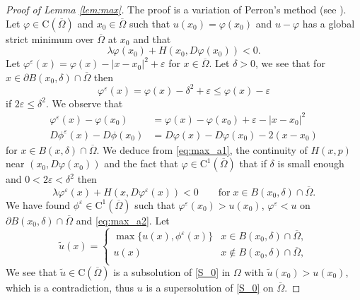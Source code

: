 \documentclass[11pt,reqno]{amsart}
\numberwithin{figure}{section}
\theoremstyle{plain}
\theoremstyle{remark}
\numberwithin{equation}{section}
\newcommand{\rmC}{\mathrm{C}}
\begin{document}
\begin{appendices}
\begin{proof}[Proof of Lemma \ref{lem:max}] The proof is a variation of Perron's method (see \cite{Capuzzo-Dolcetta1990}). Let $\varphi\in \rmC(\overline{\Omega})$ and $x_0\in \overline{\Omega}$ such that $u(x_0) = \varphi(x_0)$ and $u-\varphi$ has a global strict minimum over $\overline{\Omega}$ at $x_0$ and that 
\begin{equation}\label{eq:max_a1}
    \lambda \varphi(x_0) + H(x_0,D\varphi(x_0)) < 0.
\end{equation}
Let $\varphi^\varepsilon(x) = \varphi(x) - |x-x_0|^2 + \varepsilon$ for $x\in \overline{\Omega}$. Let $\delta > 0$, we see that for $x\in \partial B(x_0,\delta)\cap \overline{\Omega}$ then
\begin{equation*}
    \varphi^\varepsilon(x) = \varphi(x) - \delta^2 +\varepsilon \leq \varphi(x) - \varepsilon
\end{equation*}
if $2\varepsilon \leq \delta^2$. We observe that
\begin{equation*}
    \begin{split}
    \varphi^\varepsilon(x) - \varphi(x_0)  &= \varphi(x)-\varphi(x_0) + \varepsilon - |x-x_0|^2 \\
    D\phi^\varepsilon(x) - D\phi(x_0) &= D\varphi(x) - D\varphi(x_0) - 2(x-x_0)
    \end{split}
\end{equation*}
for $x\in B(x,\delta)\cap \overline{\Omega}$. We deduce from \eqref{eq:max_a1}, the continuity of $H(x,p)$ near $(x_0,D\varphi(x_0))$ and the fact that $\varphi\in \rmC^1(\overline{\Omega})$ that if $\delta$ is small enough and $0<2\varepsilon < \delta^2$ then
\begin{equation}\label{eq:max_a2}
    \lambda \varphi^\varepsilon(x)+H(x,D\varphi^\varepsilon(x)) < 0 \qquad\text{for}\;x\in B(x_0,\delta)\cap \overline{\Omega}.
\end{equation}
We have found $\phi^\varepsilon\in \mathrm{C}^1(\overline{\Omega})$ such that $\varphi^\varepsilon(x_0)>u(x_0)$, $\varphi^\varepsilon<u$ on $\partial B(x_0,\delta)\cap \overline{\Omega}$ and \eqref{eq:max_a2}. Let
\begin{equation*}
    \tilde{u}(x) = \begin{cases}
    \max \big\lbrace u(x),\phi^\varepsilon(x) \big\rbrace &x\in B(x_0,\delta)\cap \overline{\Omega},\\
    u(x)&x\notin B(x_0,\delta)\cap \overline{\Omega},\\
    \end{cases}
\end{equation*}
We see that $\tilde{u}\in \rmC(\overline{\Omega})$ is a subsolution of \eqref{S_0} in $\Omega$ with $\tilde{u}(x_0) > u(x_0)$, which is a contradiction, thus $u$ is a supersolution of \eqref{S_0} on $\overline{\Omega}$.
\end{proof}



\end{appendices}
\end{document}
